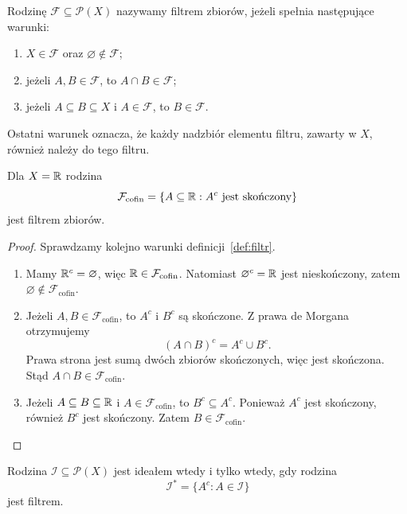 \begin{definicja}
\label{def:filtr}
Rodzinę $\mathcal{F}\subseteq\mathcal{P}(X)$ nazywamy filtrem zbiorów,
jeżeli spełnia następujące warunki:
\begin{enumerate}
  \item $X\in\mathcal{F}$ oraz $\varnothing\notin\mathcal{F}$;
  \item jeżeli $A,B\in\mathcal{F}$, to $A\cap B\in\mathcal{F}$;
  \item jeżeli $A\subseteq B\subseteq X$ i $A\in\mathcal{F}$,
  to $B\in\mathcal{F}$.
\end{enumerate}
Ostatni warunek oznacza, że każdy nadzbiór elementu filtru, zawarty
w $X$, również należy do tego filtru.
\end{definicja}

\begin{przyklad}
\label{prz:filtr-dopelnienia-skonczone}
Dla $X=\mathbb{R}$ rodzina
\begin{equation}
  \mathcal{F}_{\mathrm{cofin}}
  =\{A\subseteq\mathbb{R}:A^c\text{ jest skończony}\}
  \label{eq:filtr-dopelnienia-skonczone}
\end{equation}
jest filtrem zbiorów.
\end{przyklad}

\begin{proof}
Sprawdzamy kolejno warunki definicji~\ref{def:filtr}.
\begin{enumerate}
  \item Mamy $\mathbb{R}^c=\varnothing$, więc
  $\mathbb{R}\in\mathcal{F}_{\mathrm{cofin}}$.
  Natomiast $\varnothing^c=\mathbb{R}$ jest nieskończony, zatem
  $\varnothing\notin\mathcal{F}_{\mathrm{cofin}}$.
  \item Jeżeli $A,B\in\mathcal{F}_{\mathrm{cofin}}$, to
  $A^c$ i $B^c$ są skończone. Z prawa de Morgana otrzymujemy
  \[
    (A\cap B)^c=A^c\cup B^c.
  \]
  Prawa strona jest sumą dwóch zbiorów skończonych, więc jest skończona.
  Stąd $A\cap B\in\mathcal{F}_{\mathrm{cofin}}$.
  \item Jeżeli $A\subseteq B\subseteq\mathbb{R}$ i
  $A\in\mathcal{F}_{\mathrm{cofin}}$, to $B^c\subseteq A^c$.
  Ponieważ $A^c$ jest skończony, również $B^c$ jest skończony.
  Zatem $B\in\mathcal{F}_{\mathrm{cofin}}$.
\end{enumerate}
\end{proof}

\begin{fakt}
\label{fakt:dualnosc-ideal-filtr}
Rodzina $\mathcal{I}\subseteq\mathcal{P}(X)$ jest ideałem wtedy
i tylko wtedy, gdy rodzina
\begin{equation}
  \mathcal{I}^{\ast}=\{A^c:A\in\mathcal{I}\}
  \label{eq:rodzina-dualna}
\end{equation}
jest filtrem.
\end{fakt}

